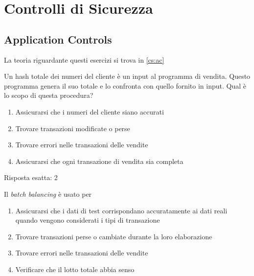 \section{Controlli di Sicurezza}
\label{esCs}

\subsection{Application Controls}
\label{esCs:ac}

La teoria riguardante questi esercizi si trova in \ref{cs:ac}


\begin{Exercise} [
  title={Quiz},
  label={esCs1}
  ]

  \Question Un hash totale dei numeri del cliente è un input al programma di
vendita. Questo programma genera il suo totale e lo confronta con quello 
fornito in input. Qual è lo scopo di questa procedura?
\begin{enumerate}
 \item Assicurarsi che i numeri del cliente siano accurati
 \item Trovare transazioni modificate o perse
 \item Trovare errori nelle transazioni delle vendite
 \item Assicurarsi che ogni transazione di vendita sia completa
\end{enumerate}

\end{Exercise}

\begin{Answer} [
  ref={esCs1},
  number={1}
  ]

  \Question Risposta esatta: 2
\end{Answer}


\begin{Exercise} [
  title={Quiz},
  label={esCs2}
  ]

  \Question Il \textit{batch balancing} \`e usato per
  \begin{enumerate}
   \item Assicurarsi che i dati di test corrispondano accuratamente ai dati
reali quando vengono considerati i tipi di transazione
   \item Trovare transazioni perse o cambiate durante la loro elaborazione
   \item Trovare errori nelle transazioni delle vendite
   \item Verificare che il lotto totale abbia senso
  \end{enumerate}
\end{Exercise}

